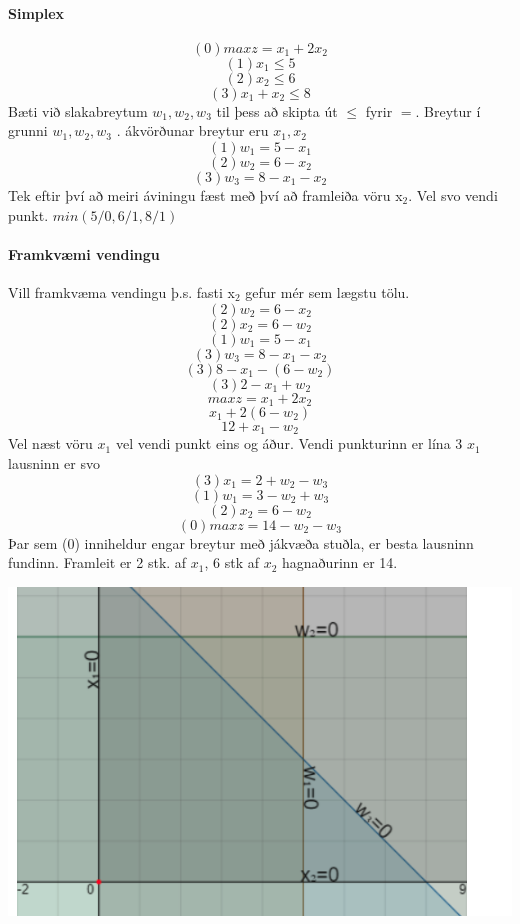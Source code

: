 \documentclass[]{article}
\begin{document}
\begin{multicols}{2}
\paragraph{Simplex}
$$ (0) max z = x_{1} + 2x_{2} $$
$$ (1) x_{1} \leq 5 $$
$$ (2) x_{2} \leq 6 $$
$$ (3) x_{1} + x_{2} \leq 8 $$ 
Bæti við slakabreytum $ w_{1}, w_{2}, w_{3}$ til þess að skipta út $\leq$ fyrir $=$. Breytur í grunni $ w_{1}, w_{2}, w_{3}$ . ákvörðunar breytur eru $x_{1},x_{2}$
$$ (1) w_{1} = 5 - x_{1} $$
$$ (2) w_{2} = 6 - x_{2} $$
$$ (3) w_{3} = 8 - x_{1} - x_{2}  $$ 
Tek eftir því að meiri áviningu fæst með því að framleiða vöru x$_{2}$. Vel svo vendi punkt. $min(5/0,6/1,8/1)$
\paragraph{Framkvæmi vendingu} Vill framkvæma vendingu þ.s. fasti x$_{2}$ gefur mér sem lægstu tölu.
$$ (2) w_{2} = 6 - x_{2} $$ $$ (2) x_{2} = 6 - w_{2}$$
$$ (1) w_{1} = 5 - x_{1} $$
$$ (3) w_{3} = 8 - x_{1} - x_{2} $$ $$ (3)  8 - x_{1} - (6 - w_{2}) $$ $$ (3)  2- x_{1} + w_{2}$$ 
$$ max z = x_{1} + 2x_{2} $$ $$ x_{1} + 2(6 - w_{2}) $$ 
$$ 12 + x_{1} - w_{2} $$
Vel næst vöru $x_{1}$ vel vendi punkt eins og áður. Vendi punkturinn er lína 3 $x_{1}$ lausninn er svo
$$(3) x_{1} = 2 + w_{2} - w_{3}$$
$$(1) w_{1} = 3 - w_{2} + w_{3}$$
$$(2) x_{2} = 6 - w_{2} $$
$$(0) maxz  = 14 - w_{2} - w_{3} $$
Þar sem (0) inniheldur engar breytur með jákvæða stuðla, er besta lausninn fundinn. Framleit er 2 stk. af $x_{1}$, 6 stk af $x_{2}$ hagnaðurinn er 14.\\
\begin{center}
\includegraphics[scale=0.5]{mynd}
\end{center}

\end{multicols}
\end{document}

